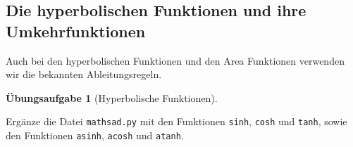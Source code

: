 \documentclass[
  letterpaper,
  DIV=11,
  oneside]{scrreprt}
\theoremstyle{definition}
\newtheorem{exercise}{Übungsaufgabe}[chapter]
\theoremstyle{definition}
\theoremstyle{remark}
\begin{document}
\hypertarget{die-hyperbolischen-funktionen-und-ihre-umkehrfunktionen}{%
\subsection{Die hyperbolischen Funktionen und ihre
Umkehrfunktionen}\label{die-hyperbolischen-funktionen-und-ihre-umkehrfunktionen}}

Auch bei den hyperbolischen Funktionen und den Area Funktionen verwenden
wir die bekannten Ableitungsregeln.

\leavevmode{}%
\begin{exercise}[Hyperbolische Funktionen]\label{exr-implementHyp}

Ergänze die Datei \texttt{mathsad.py} mit den Funktionen \texttt{sinh},
\texttt{cosh} und \texttt{tanh}, sowie den Funktionen \texttt{asinh},
\texttt{acosh} und \texttt{atanh}.

\end{exercise}
\end{document}
